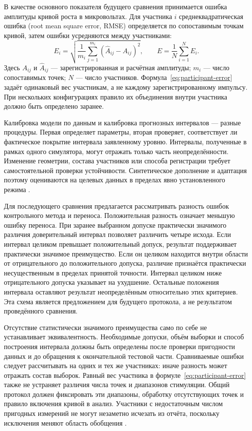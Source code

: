 В качестве основного показателя будущего сравнения принимается ошибка амплитуды кривой роста в микровольтах. Для участника $i$ среднеквадратическая ошибка (root mean square error, RMSE) определяется по сопоставимым точкам кривой, затем ошибки усредняются между участниками:
\begin{equation}
 E_i=\sqrt{\frac{1}{m_i}\sum_{j=1}^{m_i}
       (\widehat A_{ij}-A_{ij})^2}, \qquad
 E=\frac{1}{N}\sum_{i=1}^{N}E_i.
 \label{eq:participant-error}
\end{equation}
Здесь $A_{ij}$ и $\widehat A_{ij}$ --- зарегистрированная и расчётная амплитуды; $m_i$ --- число сопоставимых точек; $N$ --- число участников. Формула~\eqref{eq:participant-error} задаёт одинаковый вес участникам, а не каждому зарегистрированному импульсу. При нескольких конфигурациях правило их объединения внутри участника должно быть определено заранее.

Калибровка модели по данным и калибровка прогнозных интервалов --- разные процедуры. Первая определяет параметры, вторая проверяет, соответствует ли фактическое покрытие интервала заявленному уровню. Интервалы, полученные в рамках одного симулятора, могут отражать только часть неопределённости. Изменение геометрии, состава участников или способа регистрации требует самостоятельной проверки устойчивости. Синтетическое дополнение и адаптация поэтому оцениваются на целевых данных в пределах явно установленного режима \cite{s285,s836,s149}.

Для последующего сравнения предлагается рассматривать разность ошибок контрольного метода и переноса. Положительная разность означает меньшую ошибку переноса. При заранее выбранном допуске практически значимого различия доверительный интервал позволяет различить четыре исхода. Если интервал целиком превышает положительный допуск, результат поддерживает практически значимое преимущество. Если он целиком находится внутри области от отрицательного до положительного допуска, различие признаётся практически несущественным в пределах принятой точности. Интервал целиком ниже отрицательного допуска указывает на ухудшение. Остальные положения интервала оставляют результат неопределённым относительно этих критериев. Эта схема является предложением для будущего протокола, а не результатом проведённого сравнения.

Отсутствие статистически значимого преимущества само по себе не устанавливает эквивалентность. Необходимые допуски, объём выборки и способ построения интервала должны быть определены после проверки пригодности данных и до обращения к окончательной тестовой части. Сравниваемые ошибки следует рассчитывать на одних и тех же участниках: иначе разность может отражать состав выборок. Равный вес участника в формуле~\eqref{eq:participant-error} также не устраняет различия числа точек и диапазонов стимуляции. Общий протокол должен фиксировать эти диапазоны, обработку отсутствующих точек и правило включения кривой в анализ. Участники с недостаточным числом пригодных измерений не могут незаметно исчезать из отчёта, поскольку исключения меняют область обобщения \cite{posture,s105}.

